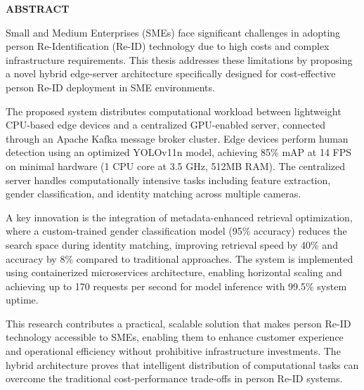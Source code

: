\documentclass[../main.tex]{subfiles}
\begin{document}
\begin{center}
    \Large{\textbf{ABSTRACT}}\\
\end{center}
\vspace{1cm}

Small and Medium Enterprises (SMEs) face significant challenges in adopting person Re-Identification (Re-ID) technology due to high costs and complex infrastructure requirements. This thesis addresses these limitations by proposing a novel hybrid edge-server architecture specifically designed for cost-effective person Re-ID deployment in SME environments.

The proposed system distributes computational workload between lightweight CPU-based edge devices and a centralized GPU-enabled server, connected through an Apache Kafka message broker cluster. Edge devices perform human detection using an optimized YOLOv11n model, achieving 85\% mAP at 14 FPS on minimal hardware (1 CPU core at 3.5 GHz, 512MB RAM). The centralized server handles computationally intensive tasks including feature extraction, gender classification, and identity matching across multiple cameras.

A key innovation is the integration of metadata-enhanced retrieval optimization, where a custom-trained gender classification model (95\% accuracy) reduces the search space during identity matching, improving retrieval speed by 40\% and accuracy by 8\% compared to traditional approaches. The system is implemented using containerized microservices architecture, enabling horizontal scaling and achieving up to 170 requests per second for model inference with 99.5\% system uptime.

This research contributes a practical, scalable solution that makes person Re-ID technology accessible to SMEs, enabling them to enhance customer experience and operational efficiency without prohibitive infrastructure investments. The hybrid architecture proves that intelligent distribution of computational tasks can overcome the traditional cost-performance trade-offs in person Re-ID systems.
\end{document}
